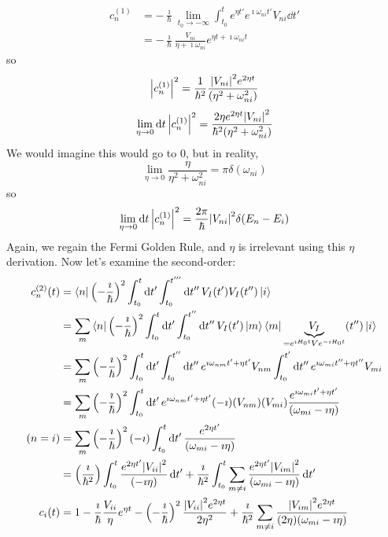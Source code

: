 \documentclass[a4paper,twoside,master.tex]{subfiles}
\begin{document}
\begin{align}
    c_n^{(1)} &= - \frac{\imath}{\hbar} \lim_{t_0 \to - \infty} \int_{t_0}^t e^{\eta t'} e^{\imath \omega_{ni} t'} V_{ni} \dd{t'} \\
    &= - \frac{\imath}{\hbar} \frac{V_{ni}}{\eta + \imath \omega_{ni}} e^{\eta t + \imath \omega_{ni} t} 
\end{align}
so
\begin{equation}
    \abs{c_n^{(1)}}^2 = \frac{1}{\hbar^2} \frac{\abs{V_{ni}}^2 e^{2 \eta t}}{(\eta^2 + \omega_{ni}^2)} 
\end{equation}
\begin{equation}
    \lim_{\eta \to 0} \dd{t} \abs{c_n^{(1)}}^2 = \frac{2 \eta e^{2 \eta t} \abs{V_{ni}}^2}{\hbar^2 (\eta^2 + \omega_{ni}^2)}
\end{equation}
We would imagine this would go to $ 0 $, but in reality,
\begin{equation}
    \lim_{\eta \to 0} \frac{\eta}{\eta^2 + \omega_{ni}^2} = \pi \delta(\omega_{ni})
\end{equation}
so
\begin{equation}
    \lim_{\eta \to 0} \dd{t} \abs{c_n^{(1)}}^2 = \frac{2 \pi}{\hbar} \abs{V_{ni}}^2 \delta(E_n - E_i)
\end{equation}
Again, we regain the Fermi Golden Rule, and $ \eta $ is irrelevant using this $\eta$ derivation. Now let's examine the second-order:
\begin{align}
    c_n^{(2)}(t) &=\bra{n} \left( - \frac{\imath}{\hbar} \right)^2 \int_{t_0}^t \dd{t'} \int_{t_0}^{t'''} \dd{t''} V_I(t') V_I(t'')\ket{i} \\
    &= \sum_m\bra{n} \left( - \frac{\imath}{\hbar} \right)^2 \int_{t_0}^t \dd{t'} \int_{t_0}^{t''} \dd{t''} V_I(t')\ket{m}\bra{m} \underbrace{V_I}_{= e^{\imath H_0 t} V e^{- \imath H_0 t}}(t'')\ket{i} \\
    &= \sum_m \left( - \frac{\imath}{\hbar} \right)^2 \int_{t_0}^t \dd{t'} \int_{t_0}^{t''} \dd{t''} e^{\imath \omega_{nm} t' + \eta t'} V_{nm} \int_{t_0}^{t'} \dd{t''} e^{\imath \omega_{mi} t'' + \eta t''} V_{mi} \\
    &= \sum_m \left( - \frac{\imath}{\hbar} \right)^2 \int_{t_0}^t \dd{t'} e^{\imath \omega_{nm} t' + \eta t'} (- \imath)(V_{nm})(V_{mi}) \frac{e^{\imath \omega_{mi} t' + \eta t'}}{(\omega_{mi} - \imath \eta)} \\
    (n = i) &= \sum_m \left( - \frac{\imath}{\hbar} \right)^2 (- \imath) \int_{t_0}^t \dd{t'} \frac{e^{2 \eta t'}}{(\omega_{mi} - \imath \eta)} \\
    &= \left( \frac{\imath}{\hbar^2} \right) \int_{t_0}^t \frac{e^{2 \eta t'} \abs{V_{ii}}^2}{(- \imath \eta)} \dd{t'} + \frac{\imath}{\hbar^2} \int_{t_0}^t \sum_{m \neq i} \frac{e^{2 \eta t'} \abs{V_{im}}^2}{(\omega_{mi} - \imath \eta)} \dd{t'} \\
    c_i(t) &= 1 - \frac{\imath}{\hbar} \frac{V_{ii}}{\eta} e^{\eta t} - \left( - \frac{\imath}{\hbar} \right)^2 \frac{\abs{V_{ii}}^2 e^{2 \eta t}}{2 \eta^2} + \frac{\imath}{\hbar^2} \sum_{m \neq i} \frac{\abs{V_{im}}^2 e^{2 \eta t}}{(2 \eta)(\omega_{mi} - \imath \eta)}
\end{align}
\end{document}
